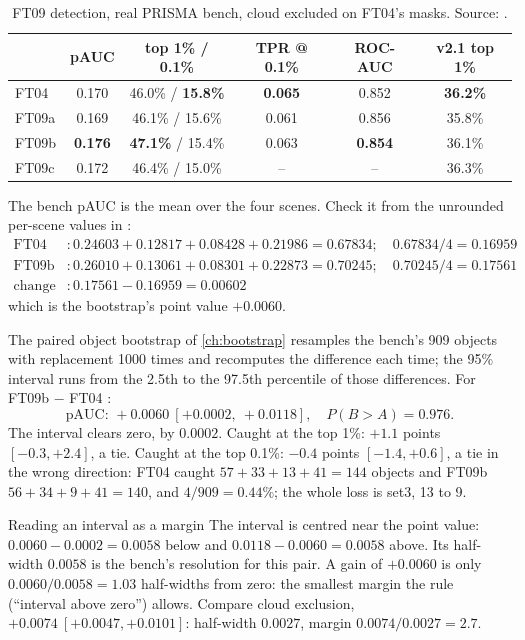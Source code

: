 \begin{table}[htbp]
\centering\small
\begin{tabular}{lccccc}
\toprule
 & pAUC & top 1\% / 0.1\% & TPR @ 0.1\% & ROC-AUC & v2.1 top 1\%\\
\midrule
FT04 & 0.170 & 46.0\% / \textbf{15.8\%} & \textbf{0.065} & 0.852 & \textbf{36.2\%}\\
FT09a & 0.169 & 46.1\% / 15.6\% & 0.061 & 0.856 & 35.8\%\\
FT09b & \textbf{0.176} & \textbf{47.1\%} / 15.4\% & 0.063 & \textbf{0.854} & 36.1\%\\
FT09c & 0.172 & 46.4\% / 15.0\% & -- & -- & 36.3\%\\
\bottomrule
\end{tabular}
\caption{FT09 detection, real PRISMA bench, cloud excluded on FT04's masks. Source: .}
\label{tab:decoderwork:ft09}
\end{table}

The bench pAUC is the mean over the four scenes. Check it from the unrounded per-scene values in
:
\begin{align*}
\text{FT04} &: 0.24603+0.12817+0.08428+0.21986 = 0.67834;\quad 0.67834/4 = 0.16959\\
\text{FT09b} &: 0.26010+0.13061+0.08301+0.22873 = 0.70245;\quad 0.70245/4 = 0.17561\\
\text{change} &: 0.17561-0.16959 = 0.00602
\end{align*}
which is the bootstrap's point value $+0.0060$.

The paired object bootstrap of \cref{ch:bootstrap} resamples the bench's 909 objects with replacement 1000 times
and recomputes the difference each time; the 95\% interval runs from the 2.5th to the 97.5th percentile of those
differences. For FT09b $-$ FT04 :
\[
\text{pAUC: } +0.0060\ [+0.0002,\ +0.0118],\quad P(B>A)=0.976 .
\]
The interval clears zero, by $0.0002$. Caught at the top 1\%: $+1.1$ points $[-0.3,+2.4]$, a tie. Caught at the
top 0.1\%: $-0.4$ points $[-1.4,+0.6]$, a tie in the wrong direction: FT04 caught $57+33+13+41=144$ objects and
FT09b $56+34+9+41=140$, and $4/909=0.44\%$; the whole loss is set3, 13 to 9.

\begin{worked}[label={we:decoderwork:interval}]{Reading an interval as a margin}
The interval is centred near the point value: $0.0060-0.0002=0.0058$ below and $0.0118-0.0060=0.0058$ above.
Its half-width $0.0058$ is the bench's resolution for this pair. A gain of $+0.0060$ is only
$0.0060/0.0058=1.03$ half-widths from zero: the smallest margin the rule (``interval above zero'') allows.
Compare cloud exclusion, $+0.0074\ [+0.0047,+0.0101]$: half-width $0.0027$, margin $0.0074/0.0027=2.7$.
\end{worked}

